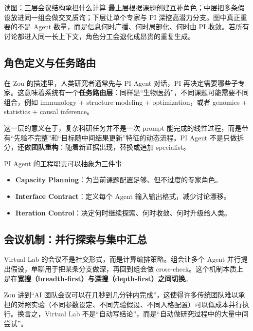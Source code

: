 \documentclass[a4paper]{article}
\begin{document}
\begin{knowledgebox}{读图：三层会议结构承担什么计算}
最上层根据课题创建互补角色；中层把多条假设放进同一组会做交叉质询；下层让单个专家与 PI 深挖高潜力分支。图中真正重要的不是 Agent 数量，而是信息何时广播、何时局部化、何时由 PI 收敛。若所有讨论都进入同一长上下文，角色分工会退化成昂贵的重复生成。
\end{knowledgebox}

\subsection{角色定义与任务路由}

在 Zou 的描述里，人类研究者通常先与 PI Agent 对话，PI 再决定需要哪些子专家。这意味着系统有一个\textbf{任务路由层}：同样是``生物医药''，不同课题可能需要不同组合，例如 immunology + structure modeling + optimization，或者 genomics + statistics + causal inference。

这一层的意义在于，复杂科研任务并不是一次 prompt 能完成的线性过程，而是带有``先验不完整''和``目标随中间结果更新''特征的动态流程。PI Agent 不是只做拆分，还做\textbf{团队重构}：随着新证据出现，替换或追加 specialist。

\begin{knowledgebox}{PI Agent 的工程职责可以抽象为三件事}
\begin{itemize}
    \item \textbf{Capacity Planning}：为当前课题配置足够、但不过度的专家角色。
    \item \textbf{Interface Contract}：定义每个 Agent 输入输出格式，减少讨论漂移。
    \item \textbf{Iteration Control}：决定何时继续探索、何时收敛、何时升级给人类。
\end{itemize}
\end{knowledgebox}

\subsection{会议机制：并行探索与集中汇总}

Virtual Lab 的会议不是社交形式，而是计算编排策略。组会让多个 Agent 并行提出假设，单聊用于把某条分支做深，再回到组会做 cross-check。这个机制本质上是在\textbf{宽搜（breadth-first）与深搜（depth-first）之间切换}。

Zou 讲到``AI 团队会议可以在几秒到几分钟内完成''，这使得许多传统团队难以承担的对照实验（不同参数设定、不同先验假设、不同人格配置）可以低成本并行执行。换言之，Virtual Lab 不是``自动写结论''，而是``自动做研究过程中的大量中间尝试''。
\end{document}
